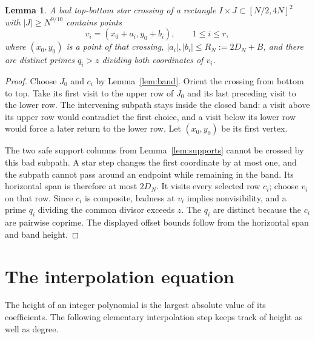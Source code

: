\documentclass[11pt]{article}
\newtheorem{lemma}[theorem]{Lemma}
\theoremstyle{definition}
\theoremstyle{remark}
\begin{document}
\begin{lemma}\label{lem:localized}
A bad top-bottom star crossing of a rectangle
$I\times J\subset[N/2,4N]^2$ with $|J|\geq N^{9/10}$ contains points
\[
                    v_i=(x_0+a_i,y_0+b_i),\qquad 1\leq i\leq r,
\]
where $(x_0,y_0)$ is a point of that crossing,
$|a_i|,|b_i|\leq R_N:=2D_N+B$, and there are distinct primes $q_i>z$
dividing both coordinates of $v_i$.
\end{lemma}
\begin{proof}
Choose $J_0$ and $c_i$ by Lemma~\ref{lem:band}.
Orient the crossing from bottom to top. Take its first visit to the upper
row of $J_0$ and its last preceding visit to the lower row. The intervening
subpath stays inside the closed band: a visit above its upper row would
contradict the first choice, and a visit below its lower row would force a
later return to the lower row. Let $(x_0,y_0)$ be its first vertex.

The two safe support columns from Lemma~\ref{lem:supports} cannot be
crossed by this bad subpath. A star step changes the first coordinate by at
most one, and the subpath cannot pass around an endpoint while remaining
in the band. Its horizontal span is therefore at most $2D_N$.
It visits every selected row $c_i$; choose $v_i$ on that row.
Since $c_i$ is composite, badness at $v_i$ implies nonvisibility, and a
prime $q_i$ dividing the common divisor exceeds $z$.
The $q_i$ are distinct because the $c_i$ are pairwise coprime.
The displayed offset bounds follow from the horizontal span and band height.
\end{proof}

\section{The interpolation equation}

The height of an integer polynomial is the largest absolute value of its
coefficients. The following elementary interpolation step keeps track of
height as well as degree.
\end{document}
